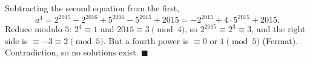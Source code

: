 Subtracting the second equation from the first,
\[a^4=2^{2015}-2^{2016}+5^{2016}-5^{2015}+2015=-2^{2015}+4\cdot5^{2015}+2015.\]
Reduce modulo $5$: $2^4\equiv1$ and $2015\equiv3\pmod4$, so $2^{2015}\equiv2^3\equiv3$, and the right side is $\equiv-3\equiv2\pmod5$. But a fourth power is $\equiv0$ or $1\pmod5$ (Fermat). Contradiction, so no solutions exist. $\blacksquare$
